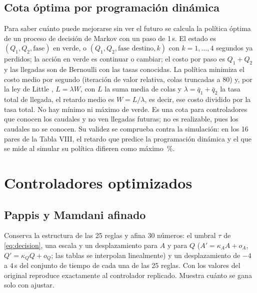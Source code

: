 \documentclass[journal]{IEEEtran}
\newcommand{\qbar}{\bar{q}}              %
\begin{document}
\subsection{Cota óptima por programación dinámica}
\label{sec:pd}
Para saber cuánto puede mejorarse sin ver el futuro se calcula la política óptima de un proceso de decisión de Markov \cite{Puterman1994} con un paso de 1\,s. El estado es $(Q_1,Q_2,\text{fase})$ en verde, o $(Q_1,Q_2,\text{fase destino},k)$ con $k=1,\dots,4$ segundos ya perdidos; la acción en verde es continuar o cambiar; el costo por paso es $Q_1+Q_2$ y las llegadas son de Bernoulli con las tasas conocidas. La política minimiza el costo medio por segundo (iteración de valor relativa, colas truncadas a 80) y, por la ley de Little \cite{Little1961}, $L=\lambda W$, con $L$ la suma media de colas y $\lambda=\qbar_1+\qbar_2$ la tasa total de llegada, el retardo medio es $W=L/\lambda$, es decir, ese costo dividido por la tasa total. No hay mínimo ni máximo de verde. Es una cota para controladores que conocen los caudales y no ven llegadas futuras; no es realizable, pues los caudales no se conocen. Su validez se comprueba contra la simulación: en los 16 pares de la Tabla VIII, el retardo que predice la programación dinámica y el que se mide al simular su política difieren como máximo \PdMaxDif\,\%.

\section{Controladores optimizados}
\label{sec:opt}

\subsection{Pappis y Mamdani afinado}
\label{sec:afinado}
Conserva la estructura de las 25 reglas y afina 30 números: el umbral $\tau$ de \eqref{eq:decision}, una escala y un desplazamiento para $A$ y para $Q$ ($A'=\kappa_AA+o_A$, $Q'=\kappa_QQ+o_Q$; las tablas se interpolan linealmente) y un desplazamiento de $-4$ a $4$\,s del conjunto de tiempo de cada una de las 25 reglas. Con los valores del original reproduce exactamente al controlador replicado. Muestra cuánto se gana solo con ajustar.
\end{document}
